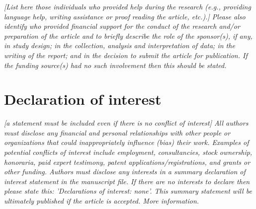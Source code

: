 \documentclass[11pt, letterpaper]{article}
\begin{document}
\textit{[List here those individuals who provided help during the research (e.g., providing language help, writing assistance or proof reading the article, etc.).] Please also identify who provided financial support for the conduct of the research and/or preparation of the article and to briefly describe the role of the sponsor(s), if any, in study design; in the collection, analysis and interpretation of data; in the writing of the report; and in the decision to submit the article for publication. If the funding source(s) had no such involvement then this should be stated.}

\section{Declaration of interest}

\textit{[a statement must be included even if there is no conflict of interest] \linebreak
All authors must disclose any financial and personal relationships with other people or organizations that could inappropriately influence (bias) their work. Examples of potential conflicts of interest include employment, consultancies, stock ownership, honoraria, paid expert testimony, patent applications/registrations, and grants or other funding. Authors must disclose any interests in a summary declaration of interest statement in the manuscript file. If there are no interests to declare then please state this: 'Declarations of interest: none'. This summary statement will be ultimately published if the article is accepted. More information.}
\end{document}
